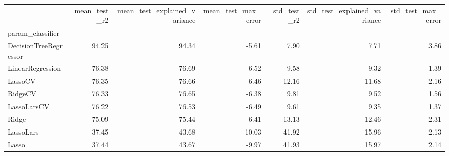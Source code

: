 \begin{tabular}{lrrrrrr}
\toprule
{} &  mean\_test\_r2 &  mean\_test\_explained\_variance &  mean\_test\_max\_error &  std\_test\_r2 &  std\_test\_explained\_variance &  std\_test\_max\_error \\
param\_classifier      &               &                               &                      &              &                              &                     \\
\midrule
DecisionTreeRegressor &         94.25 &                         94.34 &                -5.61 &         7.90 &                         7.71 &                3.86 \\
LinearRegression      &         76.38 &                         76.69 &                -6.52 &         9.58 &                         9.32 &                1.39 \\
LassoCV               &         76.35 &                         76.66 &                -6.46 &        12.16 &                        11.68 &                2.16 \\
RidgeCV               &         76.33 &                         76.65 &                -6.38 &         9.81 &                         9.52 &                1.56 \\
LassoLarsCV           &         76.22 &                         76.53 &                -6.49 &         9.61 &                         9.35 &                1.37 \\
Ridge                 &         75.09 &                         75.44 &                -6.41 &        13.13 &                        12.46 &                2.31 \\
LassoLars             &         37.45 &                         43.68 &               -10.03 &        41.92 &                        15.96 &                2.13 \\
Lasso                 &         37.44 &                         43.67 &                -9.97 &        41.93 &                        15.97 &                2.14 \\
\bottomrule
\end{tabular}
